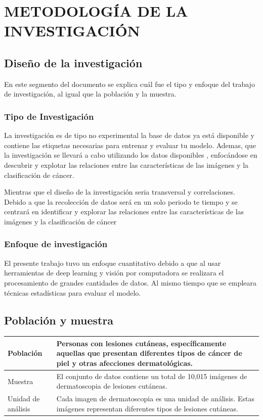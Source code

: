 \chapter{METODOLOGÍA DE LA INVESTIGACIÓN}
\section{Diseño de la investigación}
En este segmento del documento se explica cuál fue el tipo y enfoque del trabajo de investigación, al igual que la población y la muestra.


\subsection{Tipo de Investigación}
La investigación es de tipo no experimental la base de datos ya está disponible y contiene las etiquetas necesarias para entrenar y evaluar tu modelo. Ademas, que la investigación se llevará a cabo utilizando los datos disponibles , enfocándose en descubrir y explotar las relaciones entre las características de las imágenes y la clasificación de cáncer.

Mientras que el diseño de la investigación seria transversal y correlaciones. Debido a que la recolección de datos será en un solo periodo te tiempo y se centrará en identificar y explorar las relaciones entre las características de las imágenes y la clasificación de cáncer




\subsection{Enfoque de investigación}
El presente trabajo tuvo un enfoque cuantitativo debido a que al usar herramientas de deep learning y visión por computadora se realizara el procesamiento de grandes cantidades de datos. Al mismo tiempo que se empleara técnicas estadísticas para evaluar el modelo.



\section{Población y muestra}

\begin{center}
	\begin{tabular}{|p{4cm}|p{8cm}|}
		\hline
		Población & Personas con lesiones cutáneas, específicamente aquellas que presentan diferentes tipos de cáncer de piel y otras afecciones dermatológicas.  \\
		\hline
		Muestra & El conjunto de datos contiene un total de 10,015 imágenes de dermatoscopia de lesiones cutáneas. \\
		\hline
		Unidad de análisis & Cada imagen de dermatoscopia es una unidad de análisis. Estas imágenes representan diferentes tipos de lesiones cutáneas.  \\
		\hline
	\end{tabular}
\end{center}


